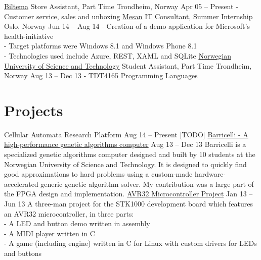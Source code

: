 \documentclass[print]{friggeri-cv}
\begin{document}
\begin{entrylist}
    \entryx
        {\href{http://biltema.no/}{Biltema}}
        {Store Assistant, Part Time}
        {Trondheim, Norway}
        {Apr 05 – Present}
        {- Customer service, sales and unboxing}
    \entryspace
    \entryx
        {\href{http://mesan.no/}{Mesan}}
        {IT Consultant, Summer Internship}
        {Oslo, Norway}
        {Jun 14 – Aug 14}
        {- Creation of a demo-application for Microsoft's health-initiative\\
         - Target platforms were Windows 8.1 and Windows Phone 8.1\\
         - Technologies used include Azure, REST, XAML and SQLite}
    \entryspace
    \entryx
        {\href{http://ntnu.no/}{Norwegian University of Science and Technology}}
        {Student Assistant, Part Time}
        {Trondheim, Norway}
        {Aug 13 – Dec 13}
        {- TDT4165 Programming Languages}
\end{entrylist}

\section{Projects}

\begin{entrylist}
    \entryy
        {Cellular Automata Research Platform}
        {Aug 14 – Present}
        {[TODO]}
    \entryspace
    \entryy
        {\href{http://barricel.li/}{Barricelli - A high-performance genetic algorithms computer}}
        {Aug 13 – Dec 13}
        {Barricelli is a specialized genetic algorithms computer designed and built by 10 students at the Norwegian University of Science and Technology.
         It is designed to quickly find good approximations to hard problems using a custom-made hardware-accelerated generic genetic algorithm solver.
         My contribution was a large part of the FPGA design and implementation.}
    \entryspace
    \entryy
        {\href{https://github.com/lundal/avr32-project-2013}{AVR32 Microcontroller Project}}
        {Jan 13 – Jun 13}
        {A three-man project for the STK1000 development board which features an AVR32 microcontroller, in three parts:\\
        - A LED and button demo written in assembly\\
        - A MIDI player written in C\\
        - A game (including engine) written in C for Linux with custom drivers for LEDs and buttons}
\end{entrylist}
\end{document}
